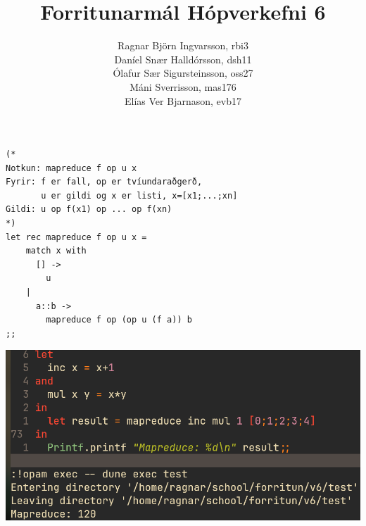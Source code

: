 \documentclass{article}
\title{Forritunarmál Hópverkefni 6}
\author{Ragnar Björn Ingvarsson, rbi3 \\
		Daníel Snær Halldórsson, dsh11 \\
		Ólafur Sær Sigursteinsson, oss27 \\
		Máni Sverrisson, mas176 \\
		Elías Ver Bjarnason, evb17}
\begin{document}
\renewcommand\thepage{}
	
	\maketitle

	\newpage
	\setcounter{page}{1}
	\renewcommand\thepage{\arabic{page}}

	\section{}
	\begin{verbatim}
(*
Notkun: mapreduce f op u x
Fyrir: f er fall, op er tvíundaraðgerð,
       u er gildi og x er listi, x=[x1;...;xn]
Gildi: u op f(x1) op ... op f(xn)
*)
let rec mapreduce f op u x =
    match x with
      [] -> 
        u
    |
      a::b ->
        mapreduce f op (op u (f a)) b
;;
	\end{verbatim}
	\begin{center}
		\includegraphics[scale=0.35]{mapreduce.png}
	\end{center}

	\newpage
\end{document}
